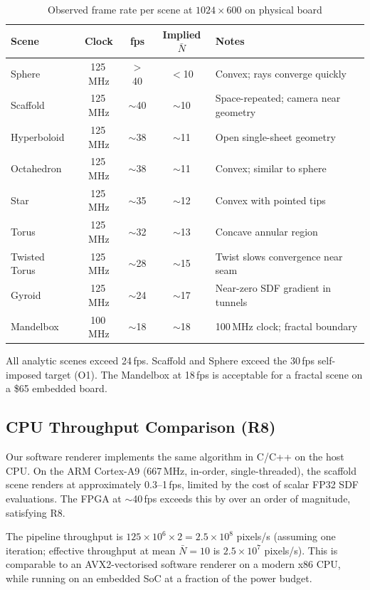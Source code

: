\begin{table}[h!]
\centering
\small
\caption{Observed frame rate per scene at $1024\times600$ on physical board}
\label{tab:fps}
{\renewcommand{\arraystretch}{1.4}
\begin{tabular}{l c c c l}
\toprule
\textbf{Scene} & \textbf{Clock} & \textbf{fps} & \textbf{Implied $\bar{N}$} & \textbf{Notes} \\
\midrule
Sphere         & 125\,MHz & $>$40        & $<$10       & Convex; rays converge quickly \\
Scaffold       & 125\,MHz & $\sim$40     & $\sim$10    & Space-repeated; camera near geometry \\
Hyperboloid    & 125\,MHz & $\sim$38     & $\sim$11    & Open single-sheet geometry \\
Octahedron     & 125\,MHz & $\sim$38     & $\sim$11    & Convex; similar to sphere \\
Star           & 125\,MHz & $\sim$35     & $\sim$12    & Convex with pointed tips \\
Torus          & 125\,MHz & $\sim$32     & $\sim$13    & Concave annular region \\
Twisted Torus  & 125\,MHz & $\sim$28     & $\sim$15    & Twist slows convergence near seam \\
Gyroid         & 125\,MHz & $\sim$24     & $\sim$17    & Near-zero SDF gradient in tunnels \\
Mandelbox      & 100\,MHz & $\sim$18     & $\sim$18    & 100\,MHz clock; fractal boundary \\
\bottomrule
\end{tabular}}
\end{table}

All analytic scenes exceed 24\,fps. Scaffold and Sphere exceed the
30\,fps self-imposed target (O1). The Mandelbox at 18\,fps is acceptable for
a fractal scene on a \$65 embedded board.

\subsection{CPU Throughput Comparison (R8)}

Our software renderer implements the same algorithm in C/C++ on the
host CPU. On the ARM Cortex-A9 (667\,MHz, in-order, single-threaded), the
scaffold scene renders at approximately 0.3--1\,fps, limited by the cost of
scalar FP32 SDF evaluations. The FPGA at $\sim$40\,fps exceeds this by over
an order of magnitude, satisfying R8.

The pipeline throughput is $125\times10^6 \times 2 = 2.5\times10^8$
pixels/s (assuming one iteration; effective throughput at mean $\bar{N}=10$
is $2.5\times10^7$ pixels/s). This is comparable to an AVX2-vectorised
software renderer on a modern x86 CPU, while running on an embedded SoC at a
fraction of the power budget.

